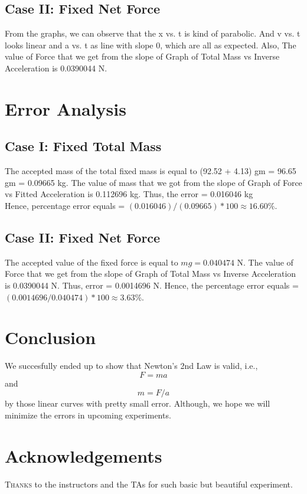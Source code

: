 \documentclass[11pt, a4paper, abstract=true]{scrartcl}
\begin{document}
\subsection{Case II: Fixed Net Force}
From the graphs, we can observe that the x vs. t is kind of parabolic. And v vs. t looks linear and a vs. t as line with slope 0, which are all as expected. Also, The value of Force that we get from the slope of Graph of Total Mass vs Inverse Acceleration is 0.0390044 N. 

\section{Error Analysis}
\subsection{Case I: Fixed Total Mass}
The accepted mass of the total fixed mass is equal to (92.52 + 4.13) gm = 96.65 gm = 0.09665 kg. The value of mass that we got from the slope of Graph of Force vs Fitted Acceleration is 0.112696 kg. Thus, the error = 0.016046 kg \\
Hence, percentage error equals = $(0.016046)/(0.09665) * 100 \approx 16.60\%$.

\subsection{Case II: Fixed Net Force}
The accepted value of the fixed force is equal to \(mg = 0.040474\) N. The value of Force that we get from the slope of Graph of Total Mass vs Inverse Acceleration is 0.0390044 N. Thus, error = 0.0014696 N. Hence, the percentage error equals = $(0.0014696/0.040474) * 100 \approx 3.63 \%$.

\section{Conclusion}
We succesfully ended up to show that Newton's 2nd Law is valid, i.e., \[F = ma\] and \[m = F/a\] by those linear curves with pretty small error. Although, we hope we will minimize the errors in upcoming experiments.

\section{Acknowledgements}
\textsc{Thanks} to the instructors and the TAs for such basic but beautiful experiment.
\end{document}
